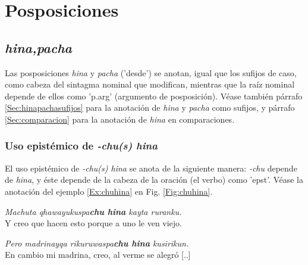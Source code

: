 \documentclass[a4paper,11pt,DIV12]{scrartcl}
\begin{document}
\section{Posposiciones}
\subsection{{\em hina,pacha}}\label{Sec:hinaPP}
Las posposiciones {\em hina} y {\em pacha} ('desde') se anotan, igual que los sufijos de caso, como cabeza del sintagma nominal que modifican, mientras que la ra\'iz nominal depende de ellos como 'p.arg' (argumento de posposici\'on). V\'ease tambi\'en p\'arrafo \ref{Sec:hinapachasufijos} para la anotaci\'on de {\em hina} y {\em pacha} como sufijos, y p\'arrafo \ref{Sec:comparacion} para la anotaci\'on de {\em hina} en comparaciones.

\subsubsection{Uso epist\'emico de {\em -chu(s) hina}}\label{Sec:chuhina}

El uso epist\'emico de {\em -chu(s) hina} se anota de la siguiente manera: {\em -chu} depende de {\em hina}, y \'este depende de la cabeza de la oraci\'on (el verbo) como 'epst'. V\'ease la anotaci\'on del ejemplo \ref{Ex:chuhina} en Fig. \ref{Fig:chuhina}.

\begin{examples}
 \item\label{Ex:chuhina} {\em Machuta qhawayukuspa\textbf{chu hina} kayta ruranku.}\\
      Y creo que hacen esto porque a uno le ven viejo.
  \item {\em Pero madrinayqa rikuruwaspa\textbf{chu hina} kusirikun.}\\
      En cambio mi madrina, creo, al verme se alegró [..]\\
      	\hfill{\small \citep{Valderrama77}}
\end{examples}
\end{document}
